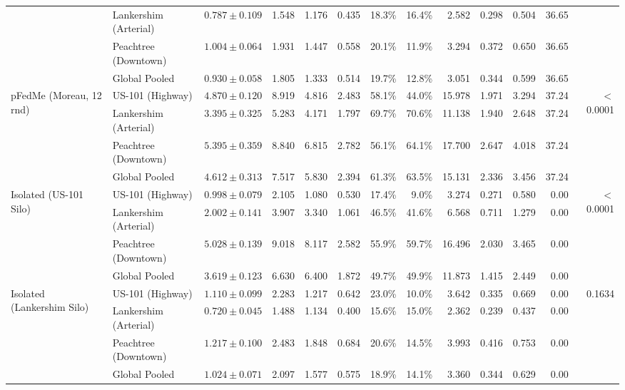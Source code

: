 \documentclass[journal]{IEEEtran}
\begin{document}
\begin{table}[!t]
{\begin{tabular}{@{}llrrrrrrrrrrr@{}}
 & Lankershim (Arterial) & $0.787 \pm 0.109$ & 1.548 & 1.176 & 0.435 & 18.3\% & 16.4\% & 2.582 & 0.298 & 0.504 & 36.65 & \\
 & Peachtree (Downtown) & $1.004 \pm 0.064$ & 1.931 & 1.447 & 0.558 & 20.1\% & 11.9\% & 3.294 & 0.372 & 0.650 & 36.65 & \\
 & Global Pooled & $0.930 \pm 0.058$ & 1.805 & 1.333 & 0.514 & 19.7\% & 12.8\% & 3.051 & 0.344 & 0.599 & 36.65 & \\
\midrule
\multirow{4}{*}{pFedMe (Moreau, 12 rnd)} & US-101 (Highway) & $4.870 \pm 0.120$ & 8.919 & 4.816 & 2.483 & 58.1\% & 44.0\% & 15.978 & 1.971 & 3.294 & 37.24 & \multirow{4}{*}{$<$0.0001} \\
 & Lankershim (Arterial) & $3.395 \pm 0.325$ & 5.283 & 4.171 & 1.797 & 69.7\% & 70.6\% & 11.138 & 1.940 & 2.648 & 37.24 & \\
 & Peachtree (Downtown) & $5.395 \pm 0.359$ & 8.840 & 6.815 & 2.782 & 56.1\% & 64.1\% & 17.700 & 2.647 & 4.018 & 37.24 & \\
 & Global Pooled & $4.612 \pm 0.313$ & 7.517 & 5.830 & 2.394 & 61.3\% & 63.5\% & 15.131 & 2.336 & 3.456 & 37.24 & \\
\midrule
\multirow{4}{*}{Isolated (US-101 Silo)} & US-101 (Highway) & $0.998 \pm 0.079$ & 2.105 & 1.080 & 0.530 & 17.4\% & 9.0\% & 3.274 & 0.271 & 0.580 & 0.00 & \multirow{4}{*}{$<$0.0001} \\
 & Lankershim (Arterial) & $2.002 \pm 0.141$ & 3.907 & 3.340 & 1.061 & 46.5\% & 41.6\% & 6.568 & 0.711 & 1.279 & 0.00 & \\
 & Peachtree (Downtown) & $5.028 \pm 0.139$ & 9.018 & 8.117 & 2.582 & 55.9\% & 59.7\% & 16.496 & 2.030 & 3.465 & 0.00 & \\
 & Global Pooled & $3.619 \pm 0.123$ & 6.630 & 6.400 & 1.872 & 49.7\% & 49.9\% & 11.873 & 1.415 & 2.449 & 0.00 & \\
\midrule
\multirow{4}{*}{Isolated (Lankershim Silo)} & US-101 (Highway) & $1.110 \pm 0.099$ & 2.283 & 1.217 & 0.642 & 23.0\% & 10.0\% & 3.642 & 0.335 & 0.669 & 0.00 & \multirow{4}{*}{0.1634} \\
 & Lankershim (Arterial) & $0.720 \pm 0.045$ & 1.488 & 1.134 & 0.400 & 15.6\% & 15.0\% & 2.362 & 0.239 & 0.437 & 0.00 & \\
 & Peachtree (Downtown) & $1.217 \pm 0.100$ & 2.483 & 1.848 & 0.684 & 20.6\% & 14.5\% & 3.993 & 0.416 & 0.753 & 0.00 & \\
 & Global Pooled & $1.024 \pm 0.071$ & 2.097 & 1.577 & 0.575 & 18.9\% & 14.1\% & 3.360 & 0.344 & 0.629 & 0.00 & \\

\end{tabular}}
\end{table}
\end{document}
